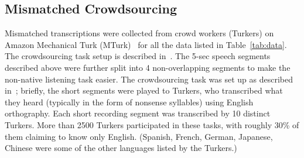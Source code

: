 
\subsection{Mismatched Crowdsourcing}

Mismatched transcriptions were collected from crowd workers (Turkers)
on Amazon Mechanical Turk (MTurk)~\cite{MTurk} for all the data listed
in Table~\ref{tab:data}.  The crowdsourcing task setup is described 
in~\cite{JHJ15b}.  The 5-sec speech segments described above
were further split into 4 non-overlapping segments to
make the non-native listening task easier. The crowdsourcing task
was set up as described in~\cite{JHJ15b}; briefly, the short segments
were played to Turkers, who transcribed what they heard (typically in 
the form of nonsense syllables) using English orthography. Each short
recording segment was
transcribed by 10 distinct Turkers. More than 2500 Turkers
participated in these tasks, with roughly 30\% of them claiming to
know only English. (Spanish, French, German, Japanese, Chinese were
some of the other languages listed by the Turkers.)
